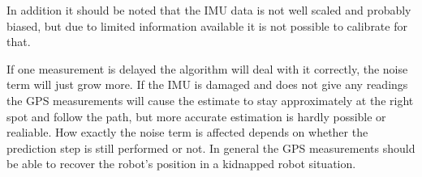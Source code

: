 \documentclass[11pt,a4paper]{article}
\begin{document}
	In addition it should be noted that the IMU data is not well scaled and probably biased, but due to limited information available it is not possible to calibrate for that.
	
	If one measurement is delayed the algorithm will deal with it correctly, the noise term will just grow more. If the IMU is damaged and does not give any readings the GPS measurements will cause the estimate to stay approximately at the right spot and follow the path, but more accurate estimation is hardly possible or realiable. How exactly the noise term is affected depends on whether the prediction step is still performed or not. In general the GPS measurements should be able to recover the robot's position in a kidnapped robot situation.
	
	
\end{document}
